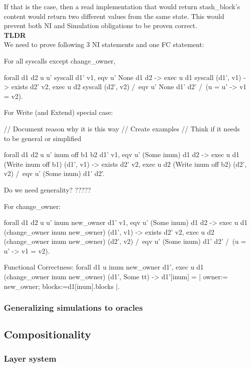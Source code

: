 \documentclass[onecolumn]{paper}
\begin{document}
			If that is the case, then a read implementation that would return stash\_block's content would return two different values from the same state. This would prevent both NI and Simulation obligations to be proven correct.\\
			
			{\bf TLDR}\\
			We need to prove following 3 NI statements and one FC statement:
			
			For all syscalls except change\_owner,
			
			forall d1 d2 u u' syscall d1' v1,
			eqv u' None d1 d2 ->
			exec u d1 syscall (d1', v1) ->
			exists d2' v2,
			exec u d2 syscall (d2', v2) /\
			eqv u' None d1' d2' /\
			(u = u' -> v1 = v2).
			
			For Write (and Extend) special case:
			
			// Document reason why it is this way
			// Create examples
			// Think if it needs to be general or simplified
			
			forall d1 d2 u u' inum off b1 b2 d1' v1,
			eqv u' (Some inum) d1 d2 ->
			exec u d1 (Write inum off b1) (d1', v1) ->
			exists d2' v2,
			exec u d2 (Write inum off b2) (d2', v2) /\
			eqv u' (Some inum) d1' d2'.
			
			
			
			Do we need generality?
			?????
			
			For change\_owner:
			
			forall d1 d2 u u' inum new\_owner d1' v1,
			eqv u' (Some inum) d1 d2 ->
			exec u d1 (change\_owner inum new\_owner) (d1', v1) ->
			exists d2' v2,
			exec u d2 (change\_owner inum new\_owner) (d2', v2) /\
			eqv u' (Some inum) d1' d2' /\
			(u = u' -> v1 = v2).	
			
			
			
			
			Functional Correctness:
			forall d1 u inum new\_owner d1',
			exec u d1 (change\_owner inum new\_owner) (d1', Some tt) ->
			d1'[inum] = {| owner:= new\_owner; blocks:=d1[inum].blocks |}.
			
			
			
		\subsubsection{Generalizing simulations to oracles}

	\subsection{Compositionality}
		\subsubsection{Layer system}
\end{document}
